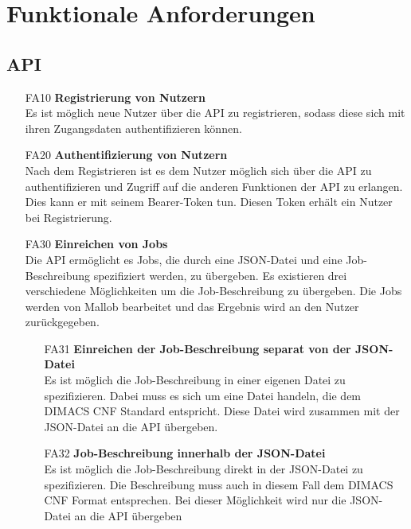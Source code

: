 \section{Funktionale Anforderungen}


\subsection{API}

\begin{itemize}
    \item[FA10] \textbf{Registrierung von Nutzern} \\
    Es ist möglich neue Nutzer über die API zu registrieren, sodass diese sich mit ihren Zugangsdaten authentifizieren können.
    
    \item[FA20] \textbf{Authentifizierung von Nutzern} \\
    Nach dem Registrieren ist es dem Nutzer möglich sich über die API zu authentifizieren und Zugriff auf die anderen Funktionen der API zu erlangen. Dies kann er mit seinem Bearer-Token tun. Diesen Token erhält ein Nutzer bei Registrierung.
    
    \item[FA30] \textbf{Einreichen von Jobs} \\
    Die API ermöglicht es Jobs, die durch eine JSON-Datei und eine Job-Beschreibung spezifiziert werden, zu übergeben. Es existieren drei verschiedene Möglichkeiten um die Job-Beschreibung zu übergeben. Die Jobs werden von Mallob bearbeitet und das Ergebnis wird an den Nutzer zurückgegeben.
    
    \begin{itemize}
        \item[FA31] \textbf{Einreichen der Job-Beschreibung separat von der JSON-Datei} \\
        Es ist möglich die Job-Beschreibung in einer eigenen Datei zu spezifizieren. Dabei muss es sich um eine Datei handeln, die dem DIMACS CNF Standard entspricht. Diese Datei wird zusammen mit der JSON-Datei an die API übergeben.
        
        \item[FA32] \textbf{Job-Beschreibung innerhalb der JSON-Datei} \\
        Es ist möglich die Job-Beschreibung direkt in der JSON-Datei zu spezifizieren. Die Beschreibung muss auch in diesem Fall dem DIMACS CNF Format entsprechen. Bei dieser Möglichkeit wird nur die JSON-Datei an die API übergeben
        

\end{itemize}
\end{itemize}
